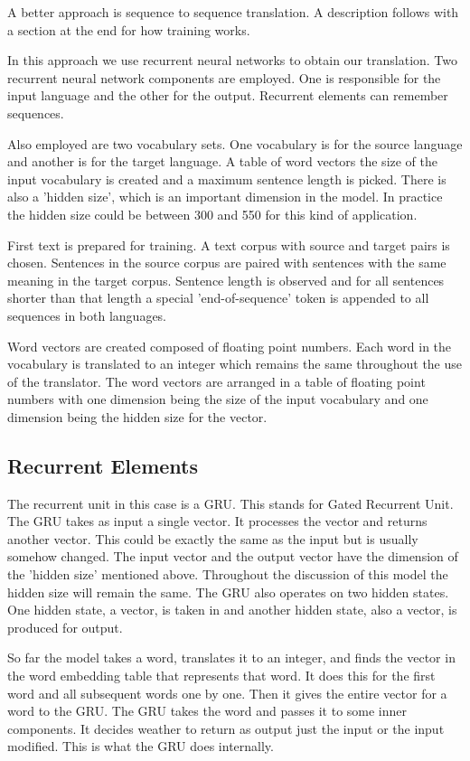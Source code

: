 A better approach is sequence to sequence translation. A description follows with a section at the end for how training works.

In this approach we use recurrent neural networks to obtain our translation. Two recurrent neural network components are employed. One is responsible for the input language and the other for the output. Recurrent elements can remember sequences. 

Also employed are two vocabulary sets. One vocabulary is for the source language and another is for the target language. A table of word vectors the size of the input vocabulary is created and a maximum sentence length is picked. There is also a 'hidden size', which is an important dimension in the model. In practice the hidden size could be between 300 and 550 for this kind of application.

First text is prepared for training. A text corpus with source and target pairs is chosen. Sentences in the source corpus are paired with sentences with the same meaning in the target corpus. Sentence length is observed and for all sentences shorter than that length a special 'end-of-sequence' token is appended to all sequences in both languages.

Word vectors are created composed of floating point numbers. Each word in the vocabulary is translated to an integer which remains the same throughout the use of the translator. The word vectors are arranged in a table of floating point numbers with one dimension being the size of the input vocabulary and one dimension being the hidden size for the vector.

\subsection*{Recurrent Elements}
The recurrent unit in this case is a GRU. This stands for Gated Recurrent Unit. The GRU takes as input a single vector. It processes the vector and returns another vector. This could be
exactly the same as the input but is usually somehow changed. The input vector and the output vector have the
dimension of the 'hidden size' mentioned above. Throughout the discussion of this model the hidden size will remain the same. The GRU also operates on two hidden states. One hidden state, a vector, is taken in and another hidden state, also a vector, is produced for output.

So far the model takes a word, translates it to an integer, and finds the vector in the word embedding table that represents that word. It does this for the first word and all subsequent words one by one. Then it gives the entire vector for a word to the GRU. The GRU takes the word and passes it to some inner components. It decides weather to return as output just the input or the input modified. This is what the GRU does internally.

